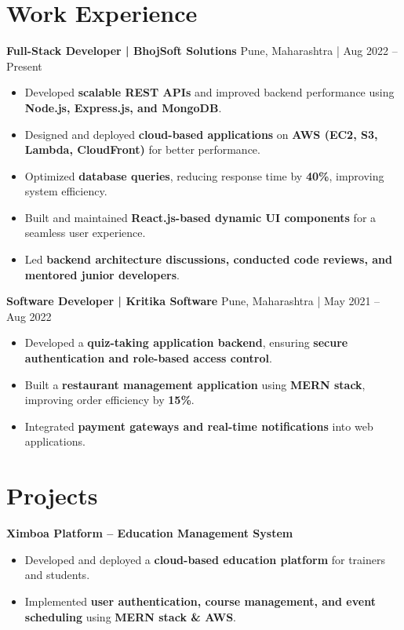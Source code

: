 \documentclass[a4paper,10pt]{article}
\begin{document}
\section*{Work Experience}
\textbf{Full-Stack Developer | BhojSoft Solutions} \hfill Pune, Maharashtra | Aug 2022 – Present
\begin{itemize}
    \item Developed \textbf{scalable REST APIs} and improved backend performance using \textbf{Node.js, Express.js, and MongoDB}.
    \item Designed and deployed \textbf{cloud-based applications} on \textbf{AWS (EC2, S3, Lambda, CloudFront)} for better performance.
    \item Optimized \textbf{database queries}, reducing response time by \textbf{40\%}, improving system efficiency.
    \item Built and maintained \textbf{React.js-based dynamic UI components} for a seamless user experience.
    \item Led \textbf{backend architecture discussions, conducted code reviews, and mentored junior developers}.
\end{itemize}

\textbf{Software Developer | Kritika Software} \hfill Pune, Maharashtra | May 2021 – Aug 2022
\begin{itemize}
    \item Developed a \textbf{quiz-taking application backend}, ensuring \textbf{secure authentication and role-based access control}.
    \item Built a \textbf{restaurant management application} using \textbf{MERN stack}, improving order efficiency by \textbf{15\%}.
    \item Integrated \textbf{payment gateways and real-time notifications} into web applications.
\end{itemize}

\section*{Projects}
\textbf{Ximboa Platform – Education Management System}
\begin{itemize}
    \item Developed and deployed a \textbf{cloud-based education platform} for trainers and students.
    \item Implemented \textbf{user authentication, course management, and event scheduling} using \textbf{MERN stack \& AWS}.
\end{itemize}
\end{document}
